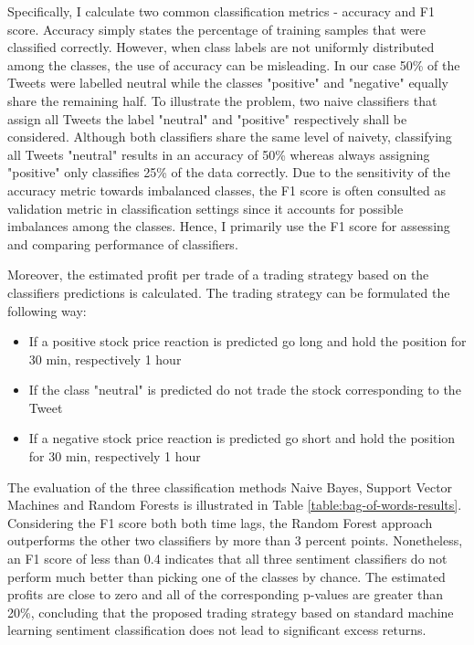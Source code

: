 \documentclass[a4paper,12pt]{article}%
\begin{document}
Specifically, I calculate two common classification metrics - accuracy and F1 score. Accuracy simply states the percentage of training samples that were classified correctly. However, when class labels are not uniformly distributed among the classes, the use of accuracy can be misleading. In our case 50\% of the Tweets were labelled neutral while the classes "positive" and "negative" equally share the remaining half. To illustrate the problem, two naive classifiers that assign all Tweets the label "neutral" and "positive" respectively shall be considered. Although both classifiers share the same level of naivety, classifying all Tweets "neutral" results in an accuracy of  50\% whereas always assigning "positive" only classifies 25\% of the data correctly. Due to the sensitivity of the accuracy metric towards imbalanced classes, the F1 score is often consulted as validation metric in classification settings since it accounts for possible imbalances among the classes. Hence, I primarily use the F1 score for assessing and comparing performance of classifiers.

Moreover, the estimated profit per trade of a trading strategy based on the classifiers predictions is calculated. The trading strategy can be formulated the following way: 
\begin{itemize}
\item If a positive stock price reaction is predicted go long and hold the position  for 30 min, respectively 1 hour
\item If the class "neutral" is predicted do not trade the stock corresponding to the Tweet
\item If a negative stock price reaction is predicted go short and hold the position for 30 min, respectively 1 hour
\end{itemize}


The evaluation of the three classification methods Naive Bayes, Support Vector Machines and Random Forests is illustrated in Table \ref{table:bag-of-words-results}. Considering the F1 score both both time lags, the Random Forest approach outperforms the other two classifiers by more than 3 percent points. Nonetheless, an F1 score of less than 0.4 indicates that all three sentiment classifiers do not perform much better than picking one of the classes by chance.
The estimated profits are close to zero and all of the corresponding p-values are greater than 20\%, concluding that the proposed trading strategy based on standard machine learning sentiment classification does not lead to significant excess returns.
\end{document}
